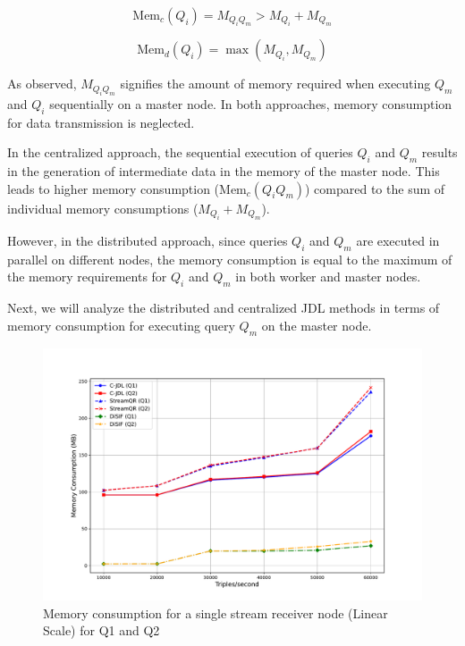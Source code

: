 \documentclass[5p,times]{elsarticle}
\begin{document}
\begin{equation}
\text{Mem}_c(Q_i) = M_{Q_i Q_m} > M_{Q_i} + M_{Q_m}
\end{equation}

\begin{equation}
\text{Mem}_d(Q_i) = \max(M_{Q_i}, M_{Q_m})
\end{equation}

As observed, $M_{Q_i Q_m}$ signifies the amount of memory required when executing $Q_m$ and $Q_i$ sequentially on a master node. In both approaches, memory consumption for data transmission is neglected.

In the centralized approach, the sequential execution of queries $Q_i$ and $Q_m$ results in the generation of intermediate data in the memory of the master node. This leads to higher memory consumption ($\text{Mem}_c(Q_i Q_m)$) compared to the sum of individual memory consumptions ($M_{Q_i} + M_{Q_m}$).

However, in the distributed approach, since queries $Q_i$ and $Q_m$ are executed in parallel on different nodes, the memory consumption is equal to the maximum of the memory requirements for $Q_i$ and $Q_m$ in both worker and master nodes.

Next, we will analyze the distributed and centralized JDL methods in terms of memory
 consumption for executing query $Q_m$ on the master node.
\begin{figure}[t] %
  \centering
  \includegraphics[width=0.8\columnwidth]{Memory_Consumption_vs_Stream_Rate_Linear_Enhanced_Q1Q2.pdf}
  \caption{Memory consumption for a single stream receiver node (Linear Scale) for Q1 and Q2}
  \label{fig:Memexperiment1}
\end{figure}
\end{document}
